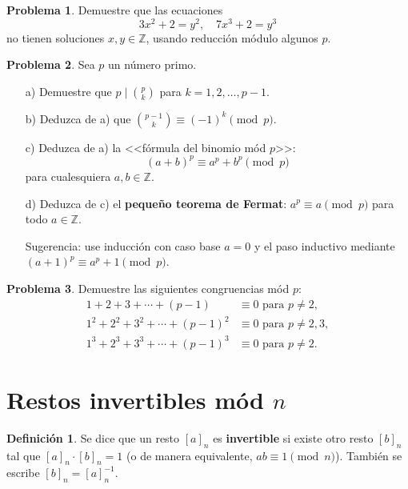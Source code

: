 \documentclass{article}
\newcommand{\ZZ}{\mathbb{Z}}
\theoremstyle{definition}
\newtheorem{problema}{Problema}[section]
\newtheorem*{definicion}{Definición}
\begin{document}
\begin{problema}
  Demuestre que las ecuaciones
  $$3x^2 + 2 = y^2, \quad 7x^3 + 2 = y^3$$
  no tienen soluciones $x,y \in \ZZ$, usando reducción módulo algunos $p$.
\end{problema}

\begin{problema}
  \label{probl:pequeno-Fermat}
  Sea $p$ un número primo.

  \begin{enumerate}
  \item[a)] Demuestre que $p\mid {p\choose k}$ para $k = 1,2,\ldots,p-1$.

  \item[b)] Deduzca de a) que ${p-1\choose k} \equiv (-1)^k \pmod{p}$.

  \item[c)] Deduzca de a) la <<fórmula del binomio mód $p$>>:
    $$(a+b)^p \equiv a^p + b^p \pmod{p}$$
    para cualesquiera $a,b \in \ZZ$.

  \item[d)] Deduzca de c) el \textbf{pequeño teorema de Fermat}:
    $a^p \equiv a \pmod{p}$ para todo $a \in \ZZ$.

    Sugerencia: use inducción con caso base $a = 0$ y el paso inductivo mediante
    $(a+1)^p \equiv a^p + 1 \pmod{p}$.
  \end{enumerate}
\end{problema}

\begin{problema}
  Demuestre las siguientes congruencias mód $p$:
  \begin{align*}
    1 + 2 + 3 + \cdots + (p-1) & \equiv 0 \text{ para }p \ne 2,\\
    1^2 + 2^2 + 3^2 + \cdots + (p-1)^2 & \equiv 0 \text{ para }p \ne 2,3,\\
    1^3 + 2^3 + 3^3 + \cdots + (p-1)^3 & \equiv 0 \text{ para }p \ne 2.
  \end{align*}
\end{problema}

\section{Restos invertibles mód $n$}

\begin{definicion}
  Se dice que un resto $[a]_n$ es \textbf{invertible} si existe otro resto
  $[b]_n$ tal que $[a]_n \cdot [b]_n = 1$
  (o de manera equivalente, $ab \equiv 1 \pmod{n}$).
  También se escribe $[b]_n = [a]_n^{-1}$.
\end{definicion}
\end{document}
